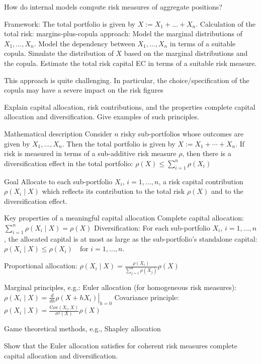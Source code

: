 How do internal models compute risk measures of aggregate positions?

Framework: The total portfolio is given by \(X := X_1 + \ldots + X_n\).
Calculation of the total risk: margins-plus-copula approach:
Model the marginal distributions of \(X_1, \ldots, X_n\).
Model the dependency between \(X_1, \ldots, X_n\) in terms of a suitable copula. 
Simulate the distribution of \(X\) based on the marginal distributions and the copula.
Estimate the total risk capital EC in terms of a suitable risk measure.

This approach is quite challenging. In particular, the choice/specification of the copula may have a severe impact on the risk figures

Explain capital allocation, risk contributions, and the properties complete capital
allocation and diversification. Give examples of such principles.


Mathematical description
Consider \(n\) risky sub-portfolios whose outcomes are given by \(X_1, \ldots, X_n\).
Then the total portfolio is given by \(X := X_1 + \cdots + X_n\).
If risk is measured in terms of a sub-additive risk measure \(\rho\), then there is a diversification effect in the total portfolio:
\(
\rho(X) \leq \sum_{i=1}^n \rho(X_i)
\)

Goal
Allocate to each sub-portfolio \(X_i\), \(i = 1, \ldots, n\), a risk capital contribution \(\rho(X_i \mid X)\) which reflects its contribution 
to the total risk \(\rho(X)\) and to the diversification effect.

Key properties of a meaningful capital allocation
Complete capital allocation: \(\sum_{i=1}^n \rho(X_i \mid X) = \rho(X)\)
Diversification: For each sub-portfolio \(X_i\), \(i = 1, \ldots, n\), the allocated capital is at most as large as the sub-portfolio’s standalone capital:
\(
\rho(X_i \mid X) \leq \rho(X_i) \quad \text{for } i = 1, \ldots, n.
\)


Proportional allocation:
\(
\rho(X_i \mid X) = \frac{\rho(X_i)}{\sum_{j=1}^n \rho(X_j)} \rho(X)
\)

Marginal principles, e.g.:
Euler allocation (for homogeneous risk measures):
\(
\rho(X_i \mid X) = \left. \frac{d}{dh} \rho(X + h X_i) \right|_{h=0}
\)
 Covariance principle:
\(
\rho(X_i \mid X) = \frac{\text{Cov}(X_i, X)}{\sigma^2(X)} \rho(X)
\)

Game theoretical methods, e.g., Shapley allocation


Show that the Euler allocation satisfies for coherent risk measures complete capital
allocation and diversification.

